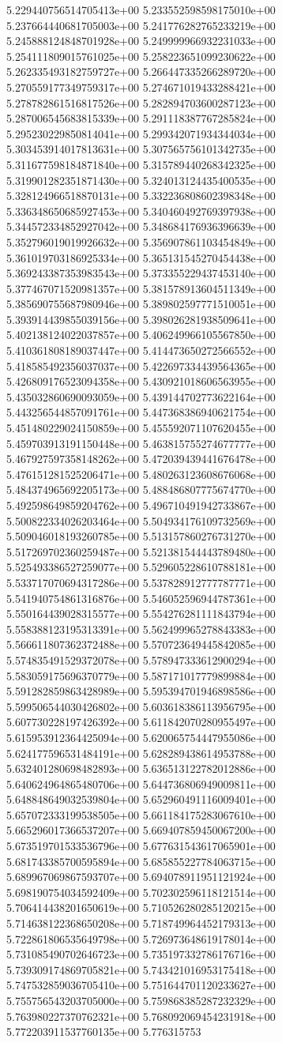 5.229440756514705413e+00	5.233552598598175010e+00	5.237664440681705003e+00	5.241776282765233219e+00	5.245888124848701928e+00	5.249999966932231033e+00	5.254111809015761025e+00	5.258223651099230622e+00	5.262335493182759727e+00	5.266447335266289720e+00	5.270559177349759317e+00	5.274671019433288421e+00	5.278782861516817526e+00	5.282894703600287123e+00	5.287006545683815339e+00	5.291118387767285824e+00	5.295230229850814041e+00	5.299342071934344034e+00	5.303453914017813631e+00	5.307565756101342735e+00	5.311677598184871840e+00	5.315789440268342325e+00	5.319901282351871430e+00	5.324013124435400535e+00	5.328124966518870131e+00	5.332236808602398348e+00	5.336348650685927453e+00	5.340460492769397938e+00	5.344572334852927042e+00	5.348684176936396639e+00	5.352796019019926632e+00	5.356907861103454849e+00	5.361019703186925334e+00	5.365131545270454438e+00	5.369243387353983543e+00	5.373355229437453140e+00	5.377467071520981357e+00	5.381578913604511349e+00	5.385690755687980946e+00	5.389802597771510051e+00	5.393914439855039156e+00	5.398026281938509641e+00	5.402138124022037857e+00	5.406249966105567850e+00	5.410361808189037447e+00	5.414473650272566552e+00	5.418585492356037037e+00	5.422697334439564365e+00	5.426809176523094358e+00	5.430921018606563955e+00	5.435032860690093059e+00	5.439144702773622164e+00	5.443256544857091761e+00	5.447368386940621754e+00	5.451480229024150859e+00	5.455592071107620455e+00	5.459703913191150448e+00	5.463815755274677777e+00	5.467927597358148262e+00	5.472039439441676478e+00	5.476151281525206471e+00	5.480263123608676068e+00	5.484374965692205173e+00	5.488486807775674770e+00	5.492598649859204762e+00	5.496710491942733867e+00	5.500822334026203464e+00	5.504934176109732569e+00	5.509046018193260785e+00	5.513157860276731270e+00	5.517269702360259487e+00	5.521381544443789480e+00	5.525493386527259077e+00	5.529605228610788181e+00	5.533717070694317286e+00	5.537828912777787771e+00	5.541940754861316876e+00	5.546052596944787361e+00	5.550164439028315577e+00	5.554276281111843794e+00	5.558388123195313391e+00	5.562499965278843383e+00	5.566611807362372488e+00	5.570723649445842085e+00	5.574835491529372078e+00	5.578947333612900294e+00	5.583059175696370779e+00	5.587171017779899884e+00	5.591282859863428989e+00	5.595394701946898586e+00	5.599506544030426802e+00	5.603618386113956795e+00	5.607730228197426392e+00	5.611842070280955497e+00	5.615953912364425094e+00	5.620065754447955086e+00	5.624177596531484191e+00	5.628289438614953788e+00	5.632401280698482893e+00	5.636513122782012886e+00	5.640624964865480706e+00	5.644736806949009811e+00	5.648848649032539804e+00	5.652960491116009401e+00	5.657072333199538505e+00	5.661184175283067610e+00	5.665296017366537207e+00	5.669407859450067200e+00	5.673519701533536796e+00	5.677631543617065901e+00	5.681743385700595894e+00	5.685855227784063715e+00	5.689967069867593707e+00	5.694078911951121924e+00	5.698190754034592409e+00	5.702302596118121514e+00	5.706414438201650619e+00	5.710526280285120215e+00	5.714638122368650208e+00	5.718749964452179313e+00	5.722861806535649798e+00	5.726973648619178014e+00	5.731085490702646723e+00	5.735197332786176716e+00	5.739309174869705821e+00	5.743421016953175418e+00	5.747532859036705410e+00	5.751644701120233627e+00	5.755756543203705000e+00	5.759868385287232329e+00	5.763980227370762321e+00	5.768092069454231918e+00	5.772203911537760135e+00	5.776315753